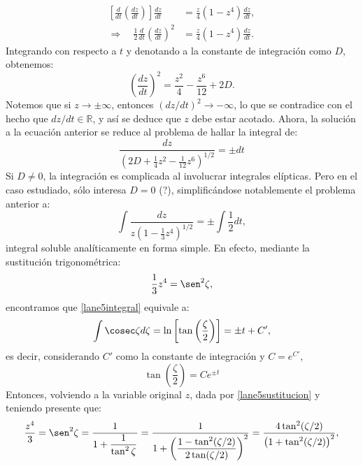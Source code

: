 \begin{align}
\left[\frac{d}{dt}\left(\frac{dz}{dt}\right)\right]\frac{dz}{dt}&=\frac{z}{4}(1-z^4)\frac{dz}{dt},\\
\Rightarrow\quad \frac{1}{2}\frac{d}{dt}\left(\frac{dz}{dt}\right)^2&=\frac{z}{4}(1-z^4)\frac{dz}{dt}.
\end{align}
Integrando con respecto a $t$ y denotando a la constante de integración como $D$, obtenemos:
\begin{equation}
\left(\frac{dz}{dt}\right)^2=\frac{z^2}{4}-\frac{z^6}{12}+2D.
\end{equation}
Notemos que si $z\to\pm\infty$, entonces $(dz/dt)^2\to-\infty$, lo que se contradice con el hecho que $dz/dt\in \mathbb{R}$, y así se deduce que $z$ debe estar acotado. Ahora, la solución a la ecuación anterior se reduce al problema de hallar la integral de:
\begin{equation}
 \frac{dz}{\left(2D+\frac{1}{4}z^2-\frac{1}{12}z^6\right)^{1/2}}=\pm dt
\end{equation}
Si $D\neq0$, la integración es complicada al involucrar integrales elípticas. Pero en el caso estudiado, sólo interesa $D=0$ (?), simplificándose notablemente el problema anterior a:
\begin{equation}\label{lane5integral}
 \int\frac{dz}{z\left(1-\frac{1}{3}z^4\right)^{1/2}}=\pm\int\frac{1}{2}dt,
\end{equation}
integral soluble analíticamente en forma simple. En efecto, mediante la sustitución trigonométrica:
\begin{equation}\label{lane5sustitucion}
\frac{1}{3}z^4=\sen^2 \zeta,
\end{equation}
encontramos que \eqref{lane5integral} equivale a:
\begin{equation}
\int\cosec\zeta d\zeta =\ln\left[\tan\left(\frac{\zeta}{2}\right)\right]=\pm t+C',
\end{equation}
es decir, considerando $C'$ como la constante de integración y $C=e^{C'}$,
\begin{equation}
 \tan\left(\frac{\zeta}{2}\right)=C e^{\pm t}
\end{equation}
Entonces, volviendo a la variable original $z$, dada por \eqref{lane5sustitucion} y teniendo presente que:
\begin{equation}
\frac{z^4}{3}= \sen^2 \zeta=\frac{1}{1+\dfrac{1}
{\tan^2\zeta}}=\frac{1}{1+\left(\dfrac{1-\tan^2(\zeta/2)}
{2\tan(\zeta/2)}\right)^2}=\frac{4\tan^2(\zeta/2)}{\left(1+\tan^2(\zeta/2)\right)^2},
\end{equation}
